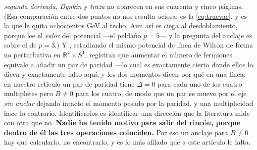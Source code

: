 \documentclass[11pt,a4paper]{article}
\begin{document}
\begin{itemize}
\emph{segunda derivada}, \emph{Dynkin} y \emph{traza} no aparecen en sus cuarenta y cinco páginas.
(Esa comparación entre dos puntos no nos resulta ociosa: es la \eqref{eq:truevac}, y es la que le
quita ochocientos GeV al techo. Aun así es ciega al desdoblamiento, porque lee el \emph{valor} del
potencial ---el peldaño $p=5$--- y la pregunta del anclaje es sobre el de $p=3$.) Y
\cite{PGY24}, estudiando el mismo potencial de línea de Wilson de forma no perturbativa en
$\mathbb{R}^4\times S^1$, registran que aumentar el número de fermiones equivale a añadir un par de
paridad ---lo cual es exactamente cierto donde ellos lo dicen y exactamente falso aquí, y los dos
momentos dicen por qué en una línea: en nuestro retículo un par de paridad tiene $\Delta=0$ para
cada uno de los cuatro multipletes pero $B\neq0$ para los cuatro, de modo que un par se mueve por el
eje \emph{sin anclar} dejando intacto el momento pesado por la paridad, y una multiplicidad hace lo
contrario. Identificarlos es identificar una dirección que la literatura mide con otra que no.
\textbf{Nadie ha tenido motivo para salir del rincón, porque dentro de él las tres operaciones
coinciden.} Por eso un anclaje para $B\neq0$ hay que calcularlo, no encontrarlo, y es lo más
afilado que a este artículo le falta.


\end{itemize}
\end{document}
